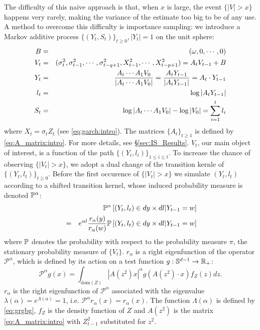 The difficulty of this naive approach is that, when $x$ is large,
the event $\{|V| > x\}$ happens very rarely, making the variance of
the estimate too big to be of any use. A method to overcome this
difficulty is importance sampling: we introduce a Markov additive
process $\{(Y_t, S_t)\}_{t \geq 0}, |Y_t| = 1$ on the unit sphere:
\begin{eqnarray*}
  B &=& (\omega, 0, \cdots, 0) \\
  V_t &=& (\sigma_t^2, \sigma_{t-1}^2, \cdots, \sigma_{t-q+1}^2,
  X_{t-1}^2, \cdots, X_{t-p+1}^2) = A_t V_{t-1} + B\\
  Y_t &=& {A_t \cdots A_1 V_0 \over |A_t \cdots A_1 V_0|}
  = {A_t Y_{t-1} \over |A_t Y_{t-1}|} = A_t \cdot Y_{t-1}\\
  l_t &=& \log |A_t Y_{t-1}| \\
  S_t &=& \log |A_t \cdots A_1 V_0| - \log |V_0|
  = \sum_{i=1}^t l_i
\end{eqnarray*}
where $X_t = \sigma_t Z_t$ (see \eqref{eq:garch:intro}). The matrices
$\{A_t\}_{t \geq 1}$ is defined by \eqref{eq:A_matrix:intro}.
For more details, see \S\ref{sec:IS_Results}.
$V_t$, our main object of interest, is a function of the path
$\{(Y_i, l_i)\}_{1 \leq i \leq t}$. To increase the chance of
observing $\{|V_t| > x\}$, we adopt a dual change of the transition
kernle of $\{(Y_t, l_t)\}_{t \geq 0}$. Before the first occurence of
$\{|V_t| > x\}$ we simulate $(Y_t, l_t)$ according to a shifted
transition kernel, whose induced probability measure is denoted
$\P^\alpha$:
\begin{eqnarray}
  &&
  \P^\alpha \left[
    (Y_t, l_t) \in dy \times dl | Y_{t-1} = w
    \right] \nonumber \\
  &=&
  e^{\alpha l} {r_\alpha(y) \over r_\alpha(w)}
  \P\left[
    (Y_t, l_t) \in dy \times dl | Y_{t-1} = w
    \right] \label{eq:pgrtgpd}
\end{eqnarray}
where $\P$ denotes the probability with respect to the probability
measure $\pi$, the stationary probability measure of $\{V_t\}$.
$r_\alpha$ is a right eigenfunction of the operator
$\mathscr P^\alpha$, which is defined by its action on
a test function $g: \sphere^{d-1} \to \reals_+$:
\[
\mathscr P^\alpha g(x) = \int_{\text{dom}(Z)} |A(z^2) x|^\alpha
g(A(z^2) \cdot x) f_{Z}(z) dz.
\]
$r_\alpha$ is the right eigenfunction of $\mathscr P^\alpha$
associated with the eigenvalue
$\lambda(\alpha) = e^{\Lambda(\alpha)} = 1$, i.e.
$\mathscr P^\alpha r_\alpha(x) = r_\alpha(x)$.
The function $\Lambda(\alpha)$ is defined by \eqref{eq:grgbg},
$f_{Z}$ is the density function of $Z$ and $A(z^2)$ is the matrix
\eqref{eq:A_matrix:intro} with $Z_{t-1}^2$ substituted for $z^2$.

